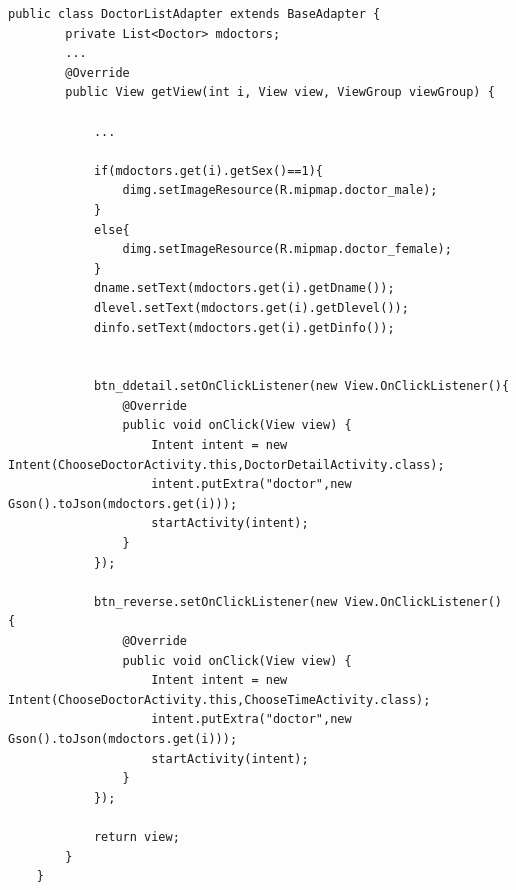 \documentclass[UTF8,12pt]{article}
\begin{document}
\begin{lstlisting}[frame=shadowbox]
    public class DoctorListAdapter extends BaseAdapter {
        private List<Doctor> mdoctors;
        ...
        @Override
        public View getView(int i, View view, ViewGroup viewGroup) {

            ...

            if(mdoctors.get(i).getSex()==1){
                dimg.setImageResource(R.mipmap.doctor_male);
            }
            else{
                dimg.setImageResource(R.mipmap.doctor_female);
            }
            dname.setText(mdoctors.get(i).getDname());
            dlevel.setText(mdoctors.get(i).getDlevel());
            dinfo.setText(mdoctors.get(i).getDinfo());


            btn_ddetail.setOnClickListener(new View.OnClickListener(){
                @Override
                public void onClick(View view) {
                    Intent intent = new Intent(ChooseDoctorActivity.this,DoctorDetailActivity.class);
                    intent.putExtra("doctor",new Gson().toJson(mdoctors.get(i)));
                    startActivity(intent);
                }
            });

            btn_reverse.setOnClickListener(new View.OnClickListener() {
                @Override
                public void onClick(View view) {
                    Intent intent = new Intent(ChooseDoctorActivity.this,ChooseTimeActivity.class);
                    intent.putExtra("doctor",new Gson().toJson(mdoctors.get(i)));
                    startActivity(intent);
                }
            });

            return view;
        }
    }
\end{lstlisting}
\end{document}
